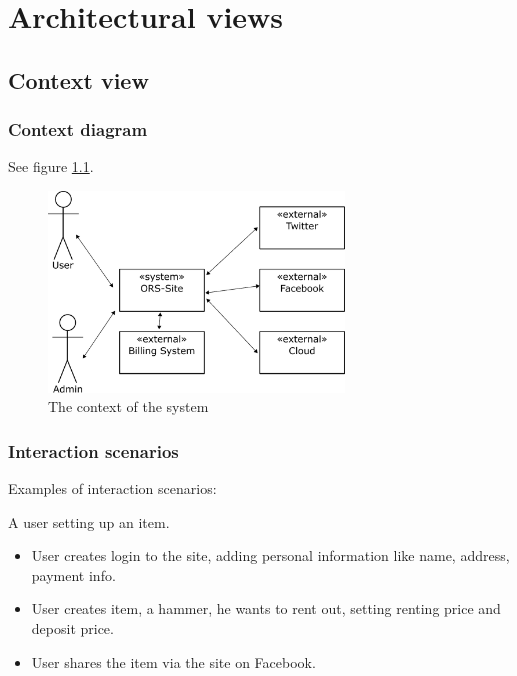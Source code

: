 \chapter{Architectural views}
\label{cha:architectural-views}
\thispagestyle{fancy}

\section{Context view}
\label{sec:context-view}

\subsection{Context diagram}
\label{sec:context-diagram}

See figure \ref{fig:context}.

\begin{figure}[h!]
  \centering
  \includegraphics[width=0.7\textwidth]{figures/context_drawing}
  \caption{The context of the system}
  \label{fig:context}
\end{figure}

\subsection{Interaction scenarios}
\label{sec:inter-scen}
Examples of interaction scenarios:

A user setting up an item.
\begin{itemize}
  \item User creates login to the site, adding personal information like name, address, payment info.
  \item User creates item, a hammer, he wants to rent out, setting renting price and deposit price.
  \item User shares the item via the site on Facebook.
\end{itemize}

